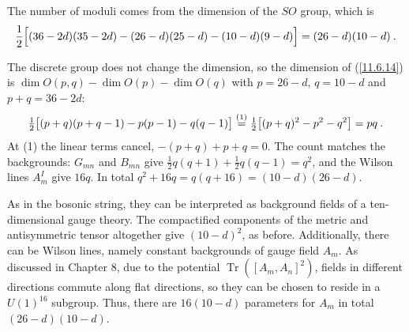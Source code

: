 The number of moduli comes from the dimension of the $SO$ group, which is
\begin{equation}
	\frac{1}{2}\Bigl[(36-2d)(35-2d)-(26-d)(25-d)-(10-d)(9-d)\Bigr]=(26-d)(10-d) \:. \label{11.6.16}
\end{equation}
\begin{tcolorbox}[breakable]
	\begin{remark}
		The discrete group does not change the dimension, so the dimension of (\ref{11.6.14}) is $\operatorname{dim}O(p,q)-\operatorname{dim}O(p)-\operatorname{dim}O(q)$ with $p=26-d$, $q=10-d$ and $p+q=36-2d$:
		\begin{equation*}
			\tfrac{1}{2}\bigl[(p+q)(p+q-1)-p(p-1)-q(q-1)\bigr]\overset{(1)}{=}\tfrac{1}{2}\bigl[(p+q)^{2}-p^{2}-q^{2}\bigr]=pq\:.
		\end{equation*}
		At (1) the linear terms cancel, $-(p+q)+p+q=0$. The count matches the backgrounds: $G_{mn}$ and $B_{mn}$ give $\frac{1}{2}q(q+1)+\frac{1}{2}q(q-1)=q^{2}$, and the Wilson lines $A^{I}_{m}$ give $16q$. In total $q^{2}+16q=q(q+16)=(10-d)(26-d)$.
	\end{remark}
\end{tcolorbox}
As in the bosonic string, they can be interpreted as background fields of a ten-dimensional gauge theory. The compactified components of the metric and antisymmetric tensor altogether give $(10-d)^{2}$, as before. Additionally, there can be Wilson lines, namely constant backgrounds of gauge field $A_{m}$. As discussed in Chapter 8, due to the potential $\operatorname{Tr}([A_{m},A_{n}]^{2})$, fields in different directions commute along flat directions, so they can be chosen to reside in a $U(1)^{16}$ subgroup. Thus, there are $16(10-d)$ parameters for $A_{m}$ in total $(26-d)(10-d)$.

